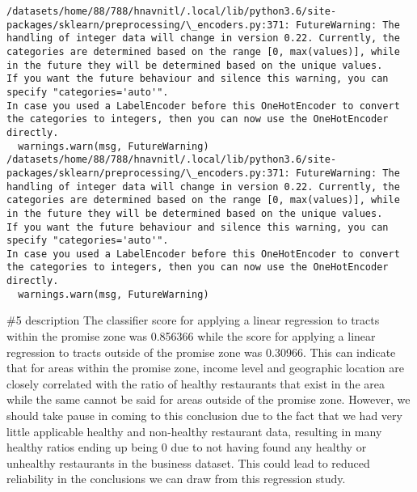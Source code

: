 \documentclass[11pt]{article}
\begin{document}
    \begin{Verbatim}[commandchars=\\\{\}]
/datasets/home/88/788/hnavnitl/.local/lib/python3.6/site-packages/sklearn/preprocessing/\_encoders.py:371: FutureWarning: The handling of integer data will change in version 0.22. Currently, the categories are determined based on the range [0, max(values)], while in the future they will be determined based on the unique values.
If you want the future behaviour and silence this warning, you can specify "categories='auto'".
In case you used a LabelEncoder before this OneHotEncoder to convert the categories to integers, then you can now use the OneHotEncoder directly.
  warnings.warn(msg, FutureWarning)
/datasets/home/88/788/hnavnitl/.local/lib/python3.6/site-packages/sklearn/preprocessing/\_encoders.py:371: FutureWarning: The handling of integer data will change in version 0.22. Currently, the categories are determined based on the range [0, max(values)], while in the future they will be determined based on the unique values.
If you want the future behaviour and silence this warning, you can specify "categories='auto'".
In case you used a LabelEncoder before this OneHotEncoder to convert the categories to integers, then you can now use the OneHotEncoder directly.
  warnings.warn(msg, FutureWarning)

    \end{Verbatim}

    \#5 description The classifier score for applying a linear regression to
tracts within the promise zone was 0.856366 while the score for applying
a linear regression to tracts outside of the promise zone was 0.30966.
This can indicate that for areas within the promise zone, income level
and geographic location are closely correlated with the ratio of healthy
restaurants that exist in the area while the same cannot be said for
areas outside of the promise zone. However, we should take pause in
coming to this conclusion due to the fact that we had very little
applicable healthy and non-healthy restaurant data, resulting in many
healthy ratios ending up being 0 due to not having found any healthy or
unhealthy restaurants in the business dataset. This could lead to
reduced reliability in the conclusions we can draw from this regression
study.
\end{document}
